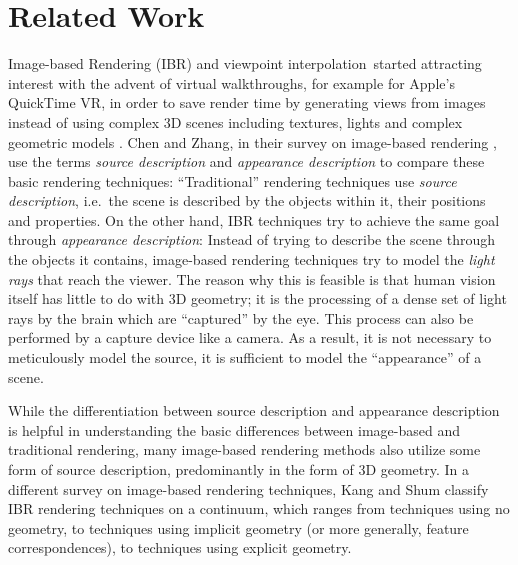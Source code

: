 \section{Related Work}\label{sec:related_work}
Image-based Rendering (IBR) and viewpoint interpolation\footnotemark\ started attracting interest with the advent of virtual walkthroughs, for example for Apple's QuickTime\textsuperscript{\textregistered} VR, in order to save render time by generating views from images instead of using complex 3D scenes including textures, lights and complex geometric models \cite{quicktime}.
Chen and Zhang, in their survey on image-based rendering \cite{survey2004}, use the terms \emph{source description} and \emph{appearance description} to compare these basic rendering techniques: ``Traditional'' rendering techniques use \emph{source description}, i.e.\ the scene is described by the objects within it, their positions and properties. On the other hand, IBR techniques try to achieve the same goal through \emph{appearance description}:
Instead of trying to describe the scene through the objects it contains, image-based rendering techniques try to model the \emph{light rays} that reach the viewer.
The reason why this is feasible is that human vision itself has little to do with 3D geometry; it is the processing of a dense set of light rays by the brain which are ``captured'' by the eye. This process can also be performed by a capture device like a camera. As a result, it is not necessary to meticulously model the source, it is sufficient to model the ``appearance'' of a scene.


While the differentiation between source description and appearance description is helpful in understanding the basic differences between image-based and traditional rendering, many image-based rendering methods also utilize some form of source description, predominantly in the form of 3D geometry. In a different survey on image-based rendering techniques, Kang and Shum \cite{survey2000} classify IBR rendering techniques on a continuum, which ranges from techniques using no geometry, to techniques using implicit geometry (or more generally, feature correspondences), to techniques using explicit geometry. %


